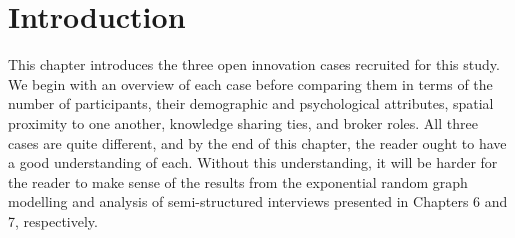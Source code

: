 \section{Introduction}

This chapter introduces the three open innovation cases recruited for this study. We begin with an overview of each case before comparing them in terms of the number of participants, their demographic and psychological attributes, spatial proximity to one another, knowledge sharing ties, and broker roles. All three cases are quite different, and by the end of this chapter, the reader ought to have a good understanding of each. Without this understanding, it will be harder for the reader to make sense of the results from the exponential random graph modelling and analysis of semi-structured interviews presented in Chapters 6 and 7, respectively. \medskip

\begin{table}
\centering
{}
\end{table}

